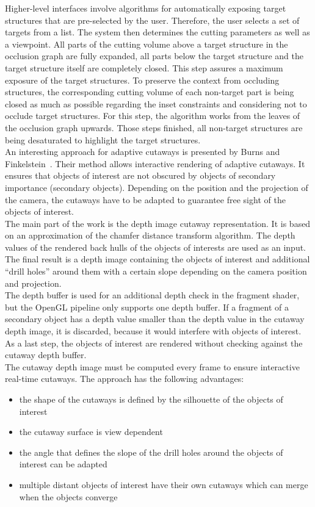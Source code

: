 Higher-level interfaces involve algorithms for automatically exposing target structures that are pre-selected by the user. Therefore, the user selects a set of targets from a list. The system then determines the cutting parameters as well as a viewpoint. All parts of the cutting volume above a target structure in the occlusion graph are fully expanded, all parts below the target structure and the target structure itself are completely closed. This step assures a maximum exposure of the target structures. To preserve the context from occluding structures, the corresponding cutting volume of each non-target part is being closed as much as possible regarding the inset constraints and considering not to occlude target structures. For this step, the algorithm works from the leaves of the occlusion graph upwards. Those steps finished, all non-target structures are being desaturated to highlight the target structures.\\
\newline
An interesting approach for adaptive cutaways is presented by Burns and Finkelstein~\cite{jour:adaptiveCutaways}. Their method allows interactive rendering of adaptive cutaways. It ensures that objects of interest are not obscured by objects of secondary importance (secondary objects). Depending on the position and the projection of the camera, the cutaways have to be adapted to guarantee free sight of the objects of interest.\\
The main part of the work is the depth image cutaway representation. It is based on an approximation of the chamfer distance transform algorithm. The depth values of the rendered back hulls of the objects of interests are used as an input. The final result is a depth image containing the objects of interest and additional "`drill holes"' around them with a certain slope depending on the camera position and projection.\\
The depth buffer is used for an additional depth check in the fragment shader, but the OpenGL pipeline only supports one depth buffer. If a fragment of a secondary object has a depth value smaller than the depth value in the cutaway depth image, it is discarded, because it would interfere with objects of interest. As a last step, the objects of interest are rendered without checking against the cutaway depth buffer.\\
The cutaway depth image must be computed every frame to ensure interactive real-time cutaways. The approach has the following advantages:
\begin{itemize}
	\item the shape of the cutaways is defined by the silhouette of the objects of interest
	\item the cutaway surface is view dependent
	\item the angle that defines the slope of the drill holes around the objects of interest can be adapted
	\item multiple distant objects of interest have their own cutaways which can merge when the objects converge
\end{itemize}
